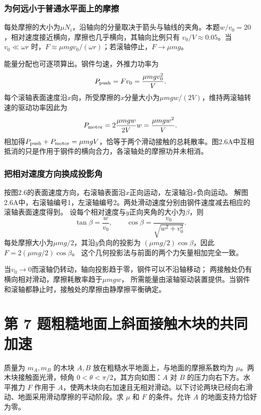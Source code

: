 \documentclass[UTF8,fontset=fandol,a4paper,11pt]{ctexart}
\newcommand{\tagline}[1]{\noindent{\small\color{muted}#1}\par}
\begin{document}
\subsubsection*{为何远小于普通水平面上的摩擦}
每处摩擦的大小为$\mu N_i$，沿轴向的分量取决于箭头与轴线的夹角。本题$w/v_0=20$，相对速度接近横向，摩擦也几乎横向，其轴向比例只有 $v_0/V\approx0.05$。当 $v_0\ll\omega r$ 时，$F\approx\mu mgv_0/(\omega r)$；若滚轴停止，$F\to\mu mg$。

能量分配也可逐项算出。钢件匀速，外推力功率为
\[P_{\rm push}=Fv_0=\frac{\mu mgv_0^2}{V}.\]
每个滚轴表面速度沿$x$向，所受摩擦的$x$分量大小为$\mu mgw/(2V)$，维持两滚轴转速的驱动功率因此为
\[P_{\rm motor}=2\frac{\mu mgw}{2V}w=\frac{\mu mgw^2}{V}.\]
相加得$P_{\rm push}+P_{\rm motor}=\mu mgV$，恰等于两个滑动接触的总耗散率。图2.6A中互相抵消的只是作用于钢件的横向合力，各滚轴处的摩擦功并未相消。

\subsubsection*{把相对速度方向换成投影角}
按图2.6的表面速度方向，右滚轴表面沿$x$正向运动，左滚轴沿$x$负向运动。
解图2.6A中，右滚轴编号1，左滚轴编号2。两处滑动速度分别由钢件速度减去相应的滚轴表面速度得到。
设每个相对速度与$y$正向夹角的大小为$\beta$，则
\[
\tan\beta=\frac{w}{v_0},\qquad
\cos\beta=\frac{v_0}{\sqrt{w^2+v_0^2}}.
\]
每处摩擦大小为$\mu mg/2$，其沿$y$负向的投影为
$(\mu mg/2)\cos\beta$，因此$F=2(\mu mg/2)\cos\beta$。
这个几何投影法与前面的两个力矢量相加完全一致。

当$v_0\to0$而滚轴仍转动，轴向投影趋于零，钢件可以不沿轴移动；
两接触处仍有横向相对滑动，摩擦耗散率趋于$\mu mgw$，
所需能量由滚轴驱动装置提供。当钢件和滚轴都静止时，接触处的摩擦由静摩擦平衡确定。




\section*{第 7 题\quad 粗糙地面上斜面接触木块的共同加速}

\tagline{M-02-07}

质量为 $m_A,m_B$ 的木块 $A,B$ 放在粗糙水平地面上，与地面的摩擦系数均为 $\mu$。两木块接触面光滑，倾角 $0<\theta<\pi/2$，其方向如图：$A$ 对 $B$ 的压力向右下方。水平推力 $F$ 作用于 $A$，使两木块向右加速且无相对滑动。以下讨论两块已经向右滑动、地面采用滑动摩擦的平动阶段。求 $\mu$ 和 $F$ 的条件。允许 $A$ 的地面支持力恰好为零。
\end{document}
